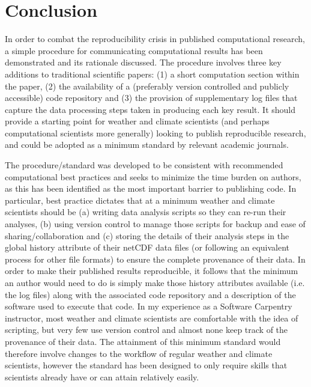 \section{Conclusion}

In order to combat the reproducibility crisis in published computational research, a simple procedure for communicating computational results has been demonstrated \citep{Irving2015} and its rationale discussed. The procedure involves three key additions to traditional scientific papers: (1) a short computation section within the paper, (2) the availability of a (preferably version controlled and publicly accessible) code repository and (3) the provision of supplementary log files that capture the data processing steps taken in producing each key result. It should provide a starting point for weather and climate scientists (and perhaps computational scientists more generally) looking to publish reproducible research, and could be adopted as a minimum standard by relevant academic journals.

The procedure/standard was developed to be consistent with recommended computational best practices and seeks to minimize the time burden on authors, as this has been identified as the most important barrier to publishing code. In particular, best practice dictates that at a minimum weather and climate scientists should be (a) writing data analysis scripts so they can re-run their analyses, (b) using version control to manage those scripts for backup and ease of sharing/collaboration and (c) storing the details of their analysis steps in the global history attribute of their netCDF data files (or following an equivalent process for other file formats) to ensure the complete provenance of their data. In order to make their published results reproducible, it follows that the minimum an author would need to do is simply make those history attributes available (i.e. the log files) along with the associated code repository and a description of the software used to execute that code. In my experience as a Software Carpentry instructor, most weather and climate scientists are comfortable with the idea of scripting, but very few use version control and almost none keep track of the provenance of their data. The attainment of this minimum standard would therefore involve changes to the workflow of regular weather and climate scientists, however the standard has been designed to only require skills that scientists already have or can attain relatively easily.  

